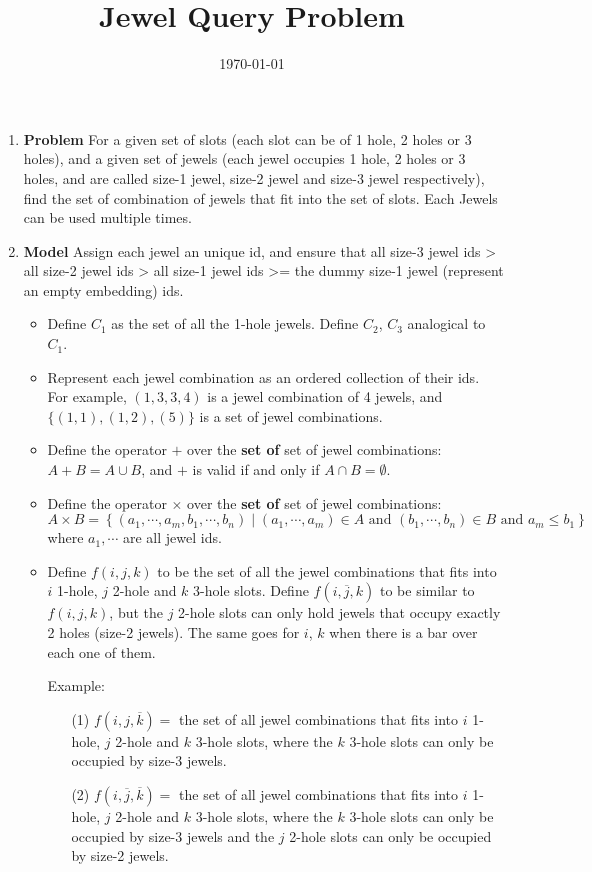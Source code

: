 \documentclass[a4paper,12pt]{article}
\title{Jewel Query Problem}
\date{\today}
\begin{document}
\maketitle

\begin{enumerate}
\item \textbf{Problem} For a given set of slots (each slot can be of 1
  hole, 2 holes or 3 holes), and a given set of jewels (each jewel
  occupies 1 hole, 2 holes or 3 holes, and are called size-1 jewel,
  size-2 jewel and size-3 jewel respectively), find the set of
  combination of jewels that fit into the set of slots. Each Jewels
  can be used multiple times.
\item \textbf{Model} Assign each jewel an unique id, and ensure that
  all size-3 jewel ids > all size-2 jewel ids > all size-1 jewel ids
  >= the dummy size-1 jewel (represent an empty embedding) ids.
  \begin{itemize}
  \item Define $C_1$ as the set of all the 1-hole jewels. Define
    $C_2$, $C_3$ analogical to $C_1$.
  \item Represent each jewel combination as an ordered collection of
    their ids. For example, $(1, 3, 3, 4)$ is a jewel combination of 4
    jewels, and $\{(1, 1), (1, 2), (5)\}$ is a set of jewel
    combinations.
  \item Define the operator $+$ over the \textbf{set of} set of jewel
    combinations: $A + B = A \cup B$, and $+$ is valid if and only if
    $A \cap B = \emptyset$.
  \item Define the operator $\times$ over the \textbf{set of} set of
    jewel combinations:
    \[
    A \times B = \left\{ (a_1, \cdots, a_m, b_1, \cdots, b_n) \mid  (a_1, \cdots, a_m) \in A \text{ and } (b_1, \cdots, b_n) \in B
      \text{ and } a_m \leq b_1 \right\}
    \]
    where $a_1, \cdots$ are all jewel ids.
  \item Define $f(i, j, k)$ to be the set of all the jewel
    combinations that fits into $i$ 1-hole, $j$ 2-hole and $k$ 3-hole
    slots. Define $f(i, \overline{j}, k)$ to be similar to $f(i, j,
    k)$, but the $j$ 2-hole slots can only hold jewels that occupy
    exactly 2 holes (size-2 jewels). The same goes for $i$, $k$ when
    there is a bar over each one of them.

    Example:
    \begin{itemize}
    \item[(1)] $f(i,j,\overline{k}) = $ the set of all jewel combinations
      that fits into $i$ 1-hole, $j$ 2-hole and $k$ 3-hole slots,
      where the $k$ 3-hole slots can only be occupied by size-3
      jewels.
    \item[(2)] $f(i,\overline{j},\overline{k}) = $ the set of all
      jewel combinations that fits into $i$ 1-hole, $j$ 2-hole and $k$
      3-hole slots, where the $k$ 3-hole slots can only be occupied by
      size-3 jewels and the $j$ 2-hole slots can only be occupied by
      size-2 jewels.
    \end{itemize}
  \end{itemize}



\end{enumerate}
\end{document}
